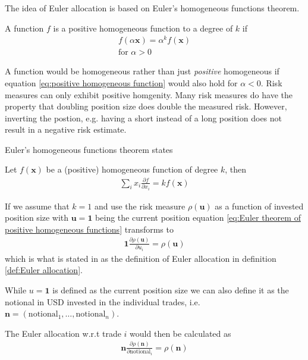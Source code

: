 \documentclass[../Thesis_AHoecherl.tex]{subfiles}
\begin{document}
The idea of Euler allocation is based on Euler's homogeneous functions theorem. 

\begin{definition}
    A function $f$ is a positive homogeneous function to a degree of $k$ if 
    \begin{align} \label{eq:positive homogeneous function}
        f\left(\alpha \mathbf{x}\right) = \alpha^k f\left(\mathbf{x}\right) \\
        \text{for } \alpha >0
    \end{align}
\end{definition}

A function would be homogeneous rather than just \emph{positive} homogeneous if equation \ref{eq:positive homogeneous function} would also hold for $\alpha < 0$.
Risk measures can only exhibit positive homgenity. Many risk measures do have the property that doubling position size does double the measured risk. 
However, inverting the postion, e.g. having a short instead of a long position does not result in a negative risk estimate. 

Euler's homogeneous functions theorem states
\begin{theorem}
    Let $f\left(\mathbf{x}\right)$ be a (positive) homogeneous function of degree $k$, then
    \begin{align}
        \sum_i{x_i \frac{\partial f}{\partial x_i}} = k f(\mathbf{x})
        \label{eq:Euler theorem of positive homogeneous functions}
    \end{align}
\end{theorem}

If we assume that $k=1$ and use the risk measure $\rho(\mathbf{u})$ as a function of invested position size with $\mathbf{u} = \mathbf{1}$ being the current position equation \ref{eq:Euler theorem of positive homogeneous functions} transforms to
\begin{align}
    \mathbf{1}\frac{\partial \rho(\mathbf{u})}{\partial u_i} = \rho(\mathbf{u})
    \label{eq:relative bump euler allocation}
\end{align}
which is what is stated in as the definition of Euler allocation in definition \ref{def:Euler allocation}.

While $u = \mathbf{1}$ is defined as the current position size we can also define it as the notional in USD invested in the individual trades, i.e. $\mathbf{n} = (\text{notional}_1, \dots, \text{notional}_n)$.

The Euler allocation w.r.t trade $i$ would then be calculated as
\begin{align}
    \mathbf{n}\frac{\partial \rho(\mathbf{n})}{\partial \text{notional}_i} = \rho(\mathbf{n})
    \label{eq:notional based euler allocation}
\end{align}
\end{document}
